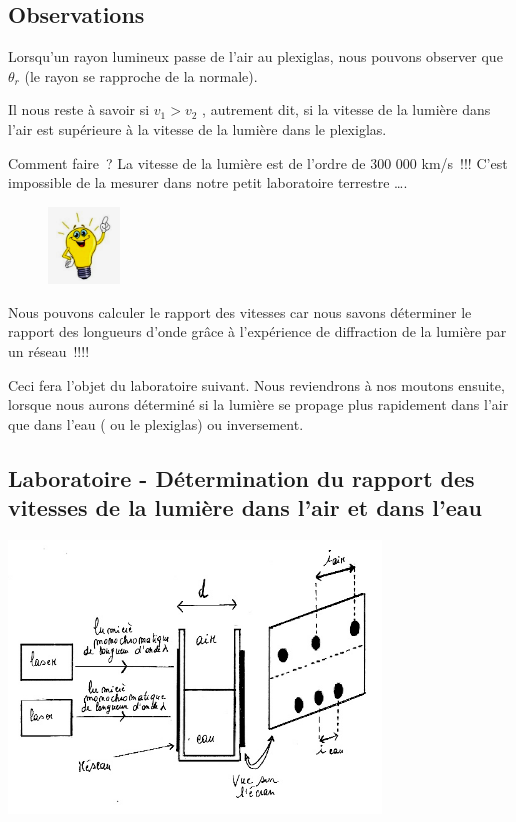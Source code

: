 \subsection{Observations }

Lorsqu'un rayon lumineux passe de l'air au plexiglas, nous pouvons
observer que $\theta_r$ (le rayon se rapproche de la normale).

Il nous reste à savoir si $v_{1} > v_{2}$ ,
autrement dit, si la vitesse de la lumière dans l'air est supérieure à la vitesse
de la lumière dans le plexiglas.

Comment faire~? La vitesse de la lumière est de l'ordre de 300 000
km/s~!!! C'est impossible de la mesurer dans notre petit laboratoire
terrestre \ldots.

\begin{figure}
\centering
\includegraphics[width=1.898cm,height=2.048cm]{Pictures/1000000100000184000001A368D3CEB0029E7460.png}
\caption{}
\end{figure}

Nous pouvons calculer le rapport des vitesses car nous savons déterminer
le rapport des longueurs d'onde grâce à l'expérience de diffraction de
la lumière par un réseau~!!!!

Ceci fera l'objet du laboratoire suivant. Nous reviendrons à nos moutons
ensuite, lorsque nous aurons déterminé si la lumière se propage plus
rapidement dans l'air que dans l'eau ( ou le plexiglas) ou inversement.

\subsection{Laboratoire - Détermination du rapport des vitesses de la lumière dans l'air et dans l'eau}

\includegraphics[width=9.885cm,height=7.243cm]{Pictures/1000000100000257000001B74156330002E2CF55.png}

